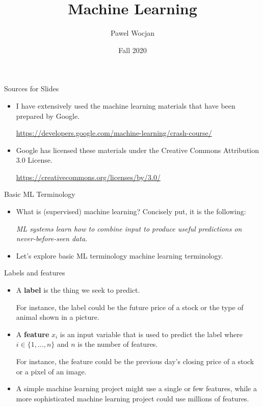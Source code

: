 \documentclass{beamer}
\title[ML]{Machine Learning}
\author{Pawel Wocjan}
\institute{University of Central Florida}
\date{Fall 2020}
\begin{document}
\begin{frame}
  \titlepage
\end{frame}

\begin{frame}{Sources for Slides}

\begin{itemize}
\item I have extensively used the machine learning materials that have been prepared by Google. 

\medskip
\footnotesize{ 
\url{https://developers.google.com/machine-learning/crash-course/}
}

\item Google has licensed these materials under the Creative Commons Attribution 3.0 License.

\medskip
\footnotesize{ 
\url{https://creativecommons.org/licenses/by/3.0/}
}
\end{itemize}
\end{frame}


\begin{frame}{Basic ML Terminology}

\begin{itemize}
\item What is (supervised) machine learning? Concisely put, it is the following:

\medskip
\emph{ML systems learn how to combine input to produce useful predictions on never-before-seen data.}

\medskip
\item Let's explore basic ML terminology machine learning terminology.
\end{itemize}
\end{frame}


\begin{frame}{Labels and features}

\begin{itemize}
\item 
A {\bf label} is the thing we seek to predict.

\medskip
For instance, the label could be the future price of a stock or the type of animal shown in a picture.

\medskip
\item 
A {\bf feature} $x_i$ is an input variable that is used to predict the label where $i\in\{1,\ldots,n\}$ and $n$ is the number of features.

\medskip
For instance, the feature could be the previous day's closing price of a stock or a pixel of an image.

\medskip
\item A simple machine learning project might use a single or few features, while a more sophisticated machine learning project could use millions of features. 
\end{itemize}

\end{frame}
\end{document}
